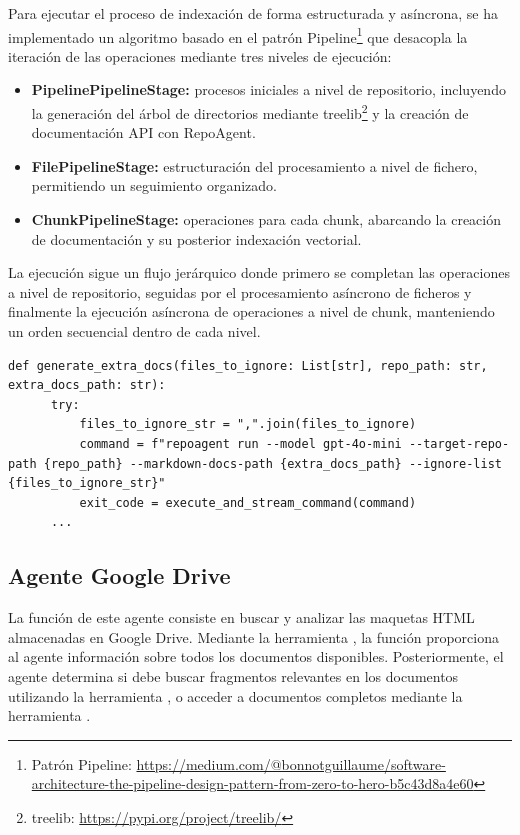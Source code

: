 Para ejecutar el proceso de indexación de forma estructurada y asíncrona, se ha implementado un algoritmo basado en el patrón Pipeline\footnote{Patrón Pipeline: \url{https://medium.com/@bonnotguillaume/software-architecture-the-pipeline-design-pattern-from-zero-to-hero-b5c43d8a4e60}} que desacopla la iteración de las operaciones mediante tres niveles de ejecución:
\begin{itemize}
\item\textbf{PipelinePipelineStage:} procesos iniciales a nivel de repositorio, incluyendo la generación del árbol de directorios mediante treelib\footnote{treelib: \url{https://pypi.org/project/treelib/}} y la creación de documentación API con RepoAgent.
\item\textbf{FilePipelineStage:} estructuración del procesamiento a nivel de fichero, permitiendo un seguimiento organizado.
\item\textbf{ChunkPipelineStage:} operaciones para cada chunk, abarcando la creación de documentación y su posterior indexación vectorial.
\end{itemize}
La ejecución sigue un flujo jerárquico donde primero se completan las operaciones a nivel de repositorio, seguidas por el procesamiento asíncrono de ficheros y finalmente la ejecución asíncrona de operaciones a nivel de chunk, manteniendo un orden secuencial dentro de cada nivel.

\begin{lstlisting}[caption={\protect\opus{generate_extra_docs}: ejecución de agente RepoAgent para crear la documentación API}, label={lst:repoagent}]
  def generate_extra_docs(files_to_ignore: List[str], repo_path: str, extra_docs_path: str):
      try:
          files_to_ignore_str = ",".join(files_to_ignore)
          command = f"repoagent run --model gpt-4o-mini --target-repo-path {repo_path} --markdown-docs-path {extra_docs_path} --ignore-list {files_to_ignore_str}"
          exit_code = execute_and_stream_command(command)
      ...
\end{lstlisting}

\subsection{Agente Google Drive}
La función de este agente consiste en buscar y analizar las maquetas HTML almacenadas en Google Drive. Mediante la herramienta , la función  proporciona al agente información sobre todos los documentos disponibles. Posteriormente, el agente determina si debe buscar fragmentos relevantes en los documentos utilizando la herramienta , o acceder a documentos completos mediante la herramienta .

